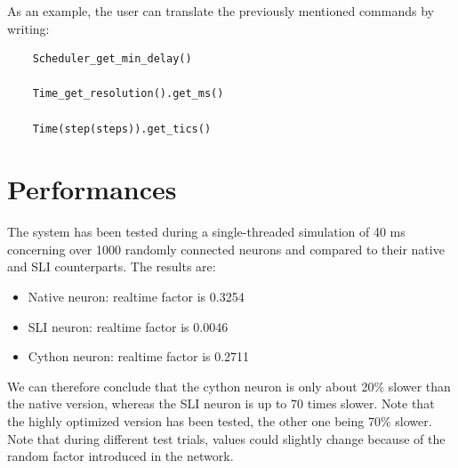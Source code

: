 \documentclass{article}
\begin{document}
As an example, the user can translate the previously mentioned commands by writing:
\begin{verbatim}
    Scheduler_get_min_delay()

    Time_get_resolution().get_ms()

    Time(step(steps)).get_tics()
\end{verbatim}

\section{Performances}
The system has been tested during a single-threaded simulation of 40 ms concerning over 1000 randomly connected neurons and compared to their native and SLI counterparts. The results are:
\begin{itemize}
\item Native neuron: realtime factor is 0.3254
\item SLI neuron: realtime factor is 0.0046
\item Cython neuron: realtime factor is 0.2711
\end{itemize}
We can therefore conclude that the cython neuron is only about 20\% slower than the native version, whereas the SLI neuron is up to 70 times slower. Note that the highly optimized version has been tested, the other one being 70\% slower.\\
Note that during different test trials, values could slightly change because of the random factor introduced in the network.\\
\end{document}
